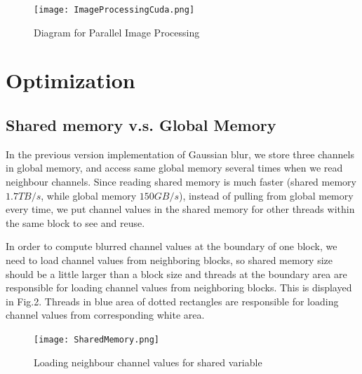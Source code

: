 \documentclass[journal,11pt,onecolumn,draftclsnofoot]{ieeeconf}  %
\begin{document}
\begin{figure}[h]
	\centering\texttt{[image: ImageProcessingCuda.png]}
	\caption{Diagram for Parallel Image Processing}
	\label{parallel}
\end{figure}


\section{Optimization}

\subsection{Shared memory v.s. Global Memory}
In the previous version implementation of Gaussian blur, we store three channels in global memory, and access same global memory several times when we read neighbour channels. Since reading shared memory is much faster (shared memory $1.7TB/s$, while global memory $150GB/s$), instead of pulling from global memory every time, we put channel values in the shared memory for other threads within the same block to see and reuse. 

In order to compute blurred channel values at the boundary of one block, we need to load channel values from neighboring blocks, so shared memory size should be a little larger than a block size and threads at the boundary area are responsible for loading channel values from neighboring blocks. This is displayed in Fig.2. Threads in blue area of dotted rectangles are responsible for loading channel values from corresponding white area.

\begin{figure}[h]
	\centering\texttt{[image: SharedMemory.png]}
	\caption{Loading neighbour channel values for shared variable}
	\label{parallel}
\end{figure}
\end{document}
